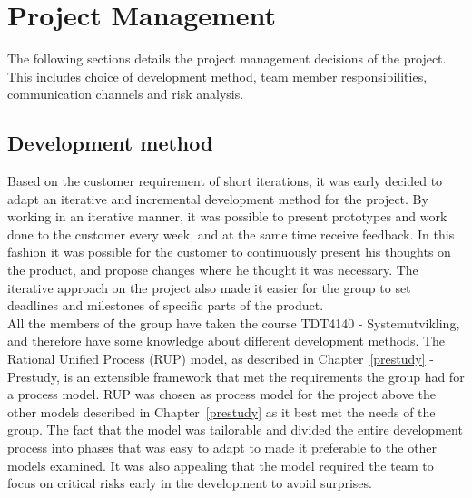 \chapter{Project Management}
The following sections details the project management decisions of the project. This includes choice of development method, team member responsibilities, communication channels and risk analysis.

\section{Development method}
\label{development-method}
Based on the customer requirement of short iterations, it was early decided to adapt an iterative and incremental development method for the project. By working in an iterative manner, it was possible to present prototypes and work done to the customer every week, and at the same time receive feedback. In this fashion it was possible for the customer to continuously present his thoughts on the product, and propose changes where he thought it was necessary. The iterative approach on the project also made it easier for the group to set deadlines and milestones of specific parts of the product.\\
\newline
All the members of the group have taken the course TDT4140 - Systemutvikling, and therefore have some knowledge about different development methods. The Rational Unified Process (RUP) model, as described in Chapter~\ref{prestudy} - Prestudy, is an extensible framework\cite{kruchten} that met the requirements the group had for a process model. RUP was chosen as process model for the project above the other models described in Chapter~\ref{prestudy} as it best met the needs of the group. The fact that the model was tailorable and divided the entire development process into phases that was easy to adapt to made it preferable to the other models examined. It was also appealing that the model required the team to focus on critical risks early in the development to avoid surprises.

